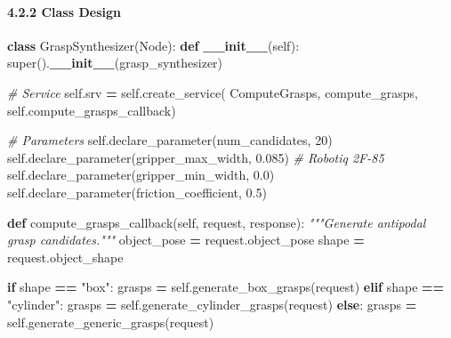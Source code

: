 \documentclass[
]{article}
\newenvironment{Shaded}{\begin{snugshade}}{\end{snugshade}}
\newcommand{\BuiltInTok}[1]{#1}
\newcommand{\CommentTok}[1]{\textcolor[rgb]{0.56,0.35,0.01}{\textit{#1}}}
\newcommand{\ControlFlowTok}[1]{\textcolor[rgb]{0.13,0.29,0.53}{\textbf{#1}}}
\newcommand{\DecValTok}[1]{\textcolor[rgb]{0.00,0.00,0.81}{#1}}
\newcommand{\FloatTok}[1]{\textcolor[rgb]{0.00,0.00,0.81}{#1}}
\newcommand{\FunctionTok}[1]{\textcolor[rgb]{0.13,0.29,0.53}{\textbf{#1}}}
\newcommand{\KeywordTok}[1]{\textcolor[rgb]{0.13,0.29,0.53}{\textbf{#1}}}
\newcommand{\NormalTok}[1]{#1}
\newcommand{\OperatorTok}[1]{\textcolor[rgb]{0.81,0.36,0.00}{\textbf{#1}}}
\newcommand{\StringTok}[1]{\textcolor[rgb]{0.31,0.60,0.02}{#1}}
\newcommand{\VariableTok}[1]{\textcolor[rgb]{0.00,0.00,0.00}{#1}}
\begin{document}
\hypertarget{class-design-3}{%
\paragraph{4.2.2 Class Design}\label{class-design-3}}

\begin{Shaded}
\begin{Highlighting}[]
\KeywordTok{class}\NormalTok{ GraspSynthesizer(Node):}
    \KeywordTok{def} \FunctionTok{\_\_init\_\_}\NormalTok{(}\VariableTok{self}\NormalTok{):}
        \BuiltInTok{super}\NormalTok{().}\FunctionTok{\_\_init\_\_}\NormalTok{(}\StringTok{\textquotesingle{}grasp\_synthesizer\textquotesingle{}}\NormalTok{)}

        \CommentTok{\# Service}
        \VariableTok{self}\NormalTok{.srv }\OperatorTok{=} \VariableTok{self}\NormalTok{.create\_service(}
\NormalTok{            ComputeGrasps, }\StringTok{\textquotesingle{}compute\_grasps\textquotesingle{}}\NormalTok{, }\VariableTok{self}\NormalTok{.compute\_grasps\_callback)}

        \CommentTok{\# Parameters}
        \VariableTok{self}\NormalTok{.declare\_parameter(}\StringTok{\textquotesingle{}num\_candidates\textquotesingle{}}\NormalTok{, }\DecValTok{20}\NormalTok{)}
        \VariableTok{self}\NormalTok{.declare\_parameter(}\StringTok{\textquotesingle{}gripper\_max\_width\textquotesingle{}}\NormalTok{, }\FloatTok{0.085}\NormalTok{)  }\CommentTok{\# Robotiq 2F{-}85}
        \VariableTok{self}\NormalTok{.declare\_parameter(}\StringTok{\textquotesingle{}gripper\_min\_width\textquotesingle{}}\NormalTok{, }\FloatTok{0.0}\NormalTok{)}
        \VariableTok{self}\NormalTok{.declare\_parameter(}\StringTok{\textquotesingle{}friction\_coefficient\textquotesingle{}}\NormalTok{, }\FloatTok{0.5}\NormalTok{)}

    \KeywordTok{def}\NormalTok{ compute\_grasps\_callback(}\VariableTok{self}\NormalTok{, request, response):}
        \CommentTok{"""Generate antipodal grasp candidates."""}
\NormalTok{        object\_pose }\OperatorTok{=}\NormalTok{ request.object\_pose}
\NormalTok{        shape }\OperatorTok{=}\NormalTok{ request.object\_shape}

        \ControlFlowTok{if}\NormalTok{ shape }\OperatorTok{==} \StringTok{"box"}\NormalTok{:}
\NormalTok{            grasps }\OperatorTok{=} \VariableTok{self}\NormalTok{.generate\_box\_grasps(request)}
        \ControlFlowTok{elif}\NormalTok{ shape }\OperatorTok{==} \StringTok{"cylinder"}\NormalTok{:}
\NormalTok{            grasps }\OperatorTok{=} \VariableTok{self}\NormalTok{.generate\_cylinder\_grasps(request)}
        \ControlFlowTok{else}\NormalTok{:}
\NormalTok{            grasps }\OperatorTok{=} \VariableTok{self}\NormalTok{.generate\_generic\_grasps(request)}


\end{Highlighting}
\end{Shaded}
\end{document}
